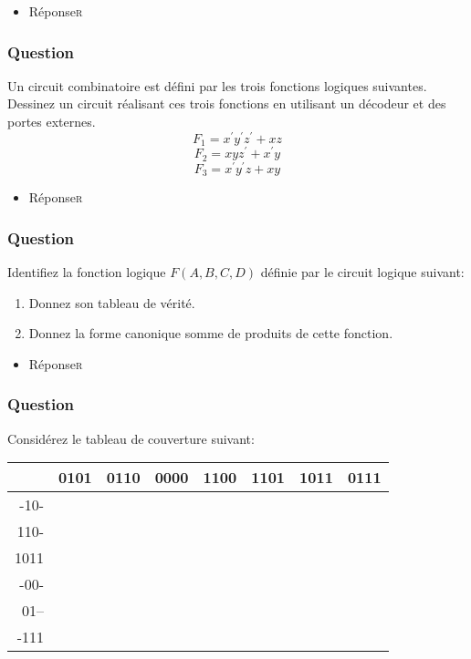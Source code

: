 \documentclass[11pt]{article}
\begin{document}
\begin{itemize}
\item Réponse\hfill{}\textsc{r}
\label{sec:orgfcc85cf}
\end{itemize}

\subsubsection*{Question}
\label{sec:org05d6a15}
Un circuit combinatoire est défini par les trois fonctions logiques
  suivantes. Dessinez un circuit réalisant ces trois fonctions en
  utilisant un décodeur et des portes externes.
  $$
    F_1  = x^{\prime} y^{\prime} z^{\prime} + xz 
    $$
  $$
    F_2  = x y z^{\prime} + x^{\prime} y 
    $$
  $$
    F_3  = x^{\prime} y^{\prime} z + x y
    $$

\begin{itemize}
\item Réponse\hfill{}\textsc{r}
\label{sec:orgab29116}
\end{itemize}

\subsubsection*{Question}
\label{sec:orgbaff456}
 Identifiez la fonction logique \(F(A,B,C,D)\) définie par le circuit
   logique suivant:
\begin{center}

\end{center}
\begin{enumerate}
\item Donnez son tableau de vérité.

\item Donnez la forme canonique somme de produits de cette fonction.
\end{enumerate}

\begin{itemize}
\item Réponse\hfill{}\textsc{r}
\label{sec:orgc58981d}
\end{itemize}

\subsubsection*{Question}
\label{sec:org7bf7517}
Considérez le tableau de couverture suivant:

\begin{center}
\begin{tabular}{rrrrrrrr}
 & 0101 & 0110 & 0000 & 1100 & 1101 & 1011 & 0111\\
\hline
-10- &  &  &  &  &  &  & \\
110- &  &  &  &  &  &  & \\
1011 &  &  &  &  &  &  & \\
-00- &  &  &  &  &  &  & \\
01-- &  &  &  &  &  &  & \\
-111 &  &  &  &  &  &  & \\
\end{tabular}
\end{center}
\end{document}
